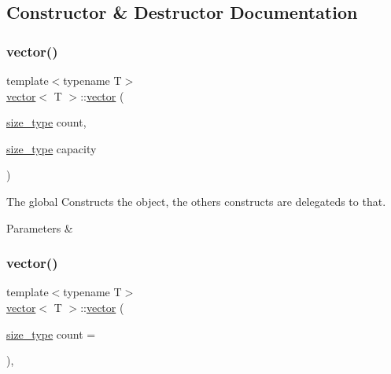 \subsection{Constructor \& Destructor Documentation}
\mbox{\label{classvector_a1768201f56ea3b2e820c191be85c2f79}} 
\subsubsection{\texorpdfstring{vector()}{vector()}\hspace{0.1cm}{\footnotesize\ttfamily [1/6]}}
{\footnotesize\ttfamily template$<$typename T$>$ \\
\hyperlink{classvector}{vector}$<$ T $>$\+::\hyperlink{classvector}{vector} (\begin{DoxyParamCaption}\item[{\hyperlink{classvector_a4d06f3ade0c2ac023b7a7edb85d9d1ef}{size\+\_\+type}}]{count,  }\item[{\hyperlink{classvector_a4d06f3ade0c2ac023b7a7edb85d9d1ef}{size\+\_\+type}}]{capacity }\end{DoxyParamCaption})\hspace{0.3cm}{\ttfamily [inline]}}



The global Constructs the object, the others constructs are delegateds to that. 


\begin{DoxyParams}{Parameters}
{\em } & \\
\hline
\end{DoxyParams}
\mbox{\label{classvector_aebcae442c842116e05ecd7ea203ad25e}} 
\subsubsection{\texorpdfstring{vector()}{vector()}\hspace{0.1cm}{\footnotesize\ttfamily [2/6]}}
{\footnotesize\ttfamily template$<$typename T$>$ \\
\hyperlink{classvector}{vector}$<$ T $>$\+::\hyperlink{classvector}{vector} (\begin{DoxyParamCaption}\item[{\hyperlink{classvector_a4d06f3ade0c2ac023b7a7edb85d9d1ef}{size\+\_\+type}}]{count = {} }\end{DoxyParamCaption})\hspace{0.3cm}{\ttfamily [inline]}, {\ttfamily [explicit]}}




